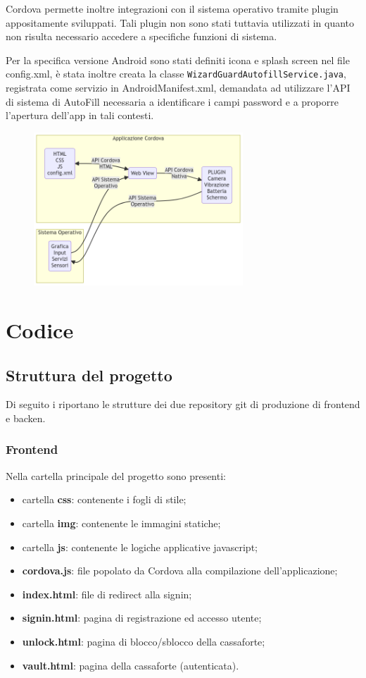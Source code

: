 \documentclass[a4paper]{report}
\begin{document}
Cordova permette inoltre integrazioni con il sistema operativo tramite plugin appositamente sviluppati. Tali plugin non sono stati tuttavia utilizzati in quanto non risulta necessario accedere a specifiche funzioni di sistema.

Per la specifica versione Android sono stati definiti icona e splash screen nel file config.xml, è stata inoltre creata la classe \texttt{WizardGuardAutofillService.java}, registrata come servizio in AndroidManifest.xml, demandata ad utilizzare l'API di sistema di AutoFill necessaria a identificare i campi password e a proporre l'apertura dell'app in tali contesti.

\begin{figure}[H]
        \centering
        \includegraphics[width=0.7\textwidth]{figures/architectures/cordova}
    \end{figure}
\chapter{Codice}
\section{Struttura del progetto}
Di seguito i riportano le strutture dei due repository git di produzione di frontend e backen.
\subsection{Frontend}
Nella cartella principale del progetto sono presenti:
\begin{itemize}
    \item cartella \textbf{css}: contenente i fogli di stile;
    \item cartella \textbf{img}: contenente le immagini statiche;
    \item cartella \textbf{js}: contenente le logiche applicative javascript;
    \item \textbf{cordova.js}: file popolato da Cordova alla compilazione dell'applicazione;
    \item \textbf{index.html}: file di redirect alla signin;
    \item \textbf{signin.html}: pagina di registrazione ed accesso utente;
    \item \textbf{unlock.html}: pagina di blocco/sblocco della cassaforte;
    \item \textbf{vault.html}: pagina della cassaforte (autenticata).
\end{itemize}
\end{document}
